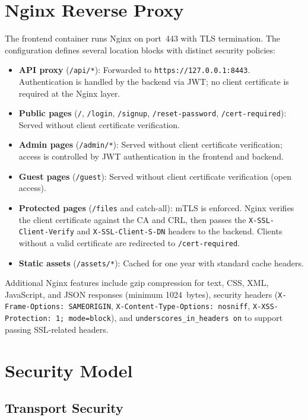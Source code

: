 \documentclass[12pt,letterpaper]{report}
\begin{document}
\section{Nginx Reverse Proxy}

The frontend container runs Nginx on port~443 with TLS termination. The configuration defines several location blocks with distinct security policies:

\begin{itemize}
    \item \textbf{API proxy} (\texttt{/api/*}): Forwarded to \texttt{https://127.0.0.1:8443}. Authentication is handled by the backend via JWT; no client certificate is required at the Nginx layer.
    \item \textbf{Public pages} (\texttt{/}, \texttt{/login}, \texttt{/signup}, \texttt{/reset-password}, \texttt{/cert-required}): Served without client certificate verification.
    \item \textbf{Admin pages} (\texttt{/admin/*}): Served without client certificate verification; access is controlled by JWT authentication in the frontend and backend.
    \item \textbf{Guest pages} (\texttt{/guest}): Served without client certificate verification (open access).
    \item \textbf{Protected pages} (\texttt{/files} and catch-all): mTLS is enforced. Nginx verifies the client certificate against the CA and CRL, then passes the \texttt{X-SSL-Client-Verify} and \texttt{X-SSL-Client-S-DN} headers to the backend. Clients without a valid certificate are redirected to \texttt{/cert-required}.
    \item \textbf{Static assets} (\texttt{/assets/*}): Cached for one year with standard cache headers.
\end{itemize}

Additional Nginx features include gzip compression for text, CSS, XML, JavaScript, and JSON responses (minimum 1024~bytes), security headers (\texttt{X-Frame-Options: SAMEORIGIN}, \texttt{X-Content-Type-Options: nosniff}, \texttt{X-XSS-Protection: 1; mode=block}), and \texttt{underscores\_in\_headers on} to support passing SSL-related headers.

\section{Security Model}

\subsection{Transport Security}
\end{document}
